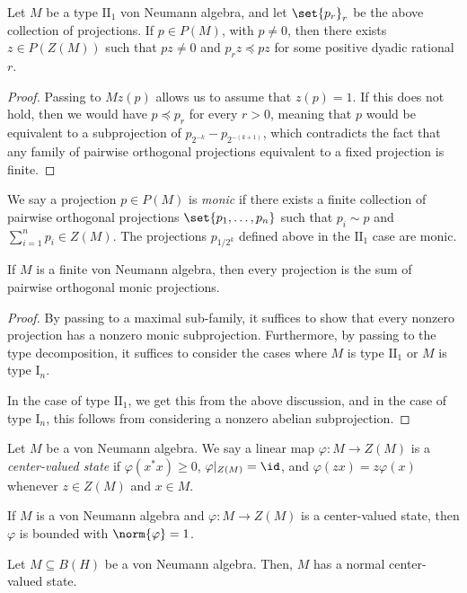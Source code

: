 \documentclass[10pt]{mypackage}
\begin{document}
\begin{lemma}
  Let $M$ be a type $\text{II}_1$ von Neumann algebra, and let $\set{p_r}_{r}$ be the above collection of projections. If $p\in P(M)$, with $p\neq 0$, then there exists $z\in P(Z(M))$ such that $pz \neq 0$ and $p_rz \preceq pz$ for some positive dyadic rational $r$.
\end{lemma}
\begin{proof}
  Passing to $Mz(p)$ allows us to assume that $z(p) = 1$. If this does not hold, then we would have $p\preceq p_r$ for every $r > 0$, meaning that $p$ would be equivalent to a subprojection of $p_{2^{-k}}-p_{2^{-\left( k+1 \right)}}$, which contradicts the fact that any family of pairwise orthogonal projections equivalent to a fixed projection is finite.
\end{proof}
We say a projection $p\in P(M)$ is \textit{monic} if there exists a finite collection of pairwise orthogonal projections $\set{p_1,\dots,p_n}$ such that $p_i\sim p$ and $\sum_{i=1}^{n}p_i\in Z(M)$. The projections $p_{1/2^{k}}$ defined above in the $\text{II}_1$ case are monic.
\begin{proposition}
  If $M$ is a finite von Neumann algebra, then every projection is the sum of pairwise orthogonal monic projections.
\end{proposition}
\begin{proof}
  By passing to a maximal sub-family, it suffices to show that every nonzero projection has a nonzero monic subprojection. Furthermore, by passing to the type decomposition, it suffices to consider the cases where $M$ is type $\text{II}_1$ or $M$ is type $\text{I}_n$.

  In the case of type $\text{II}_1$, we get this from the above discussion, and in the case of type $\text{I}_n$, this follows from considering a nonzero abelian subprojection.
\end{proof}
\begin{definition}
  Let $M$ be a von Neumann algebra. We say a linear map $\varphi\colon M\rightarrow Z(M)$ is a \textit{center-valued state} if $\varphi\left( x^{\ast}x \right) \geq 0$, $\varphi|_{Z(M)} = \id$, and $\varphi\left( zx \right) = z\varphi(x)$ whenever $z\in Z(M)$ and $x\in M$.
\end{definition}
\begin{lemma}
  If $M$ is a von Neumann algebra and $\varphi\colon M\rightarrow Z(M)$ is a center-valued state, then $\varphi$ is bounded with $\norm{\varphi} = 1$.
\end{lemma}
\begin{lemma}
  Let $M\subseteq B(H)$ be a von Neumann algebra. Then, $M$ has a normal center-valued state.
\end{lemma}
\end{document}
